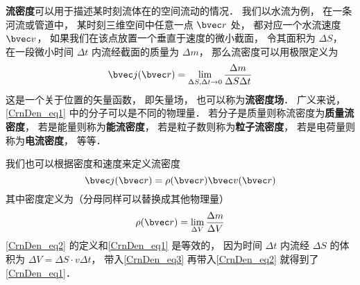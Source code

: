 

\textbf{流密度}可以用于描述某时刻流体在的空间流动的情况． 我们以水流为例， 在一条河流或管道中， 某时刻三维空间中任意一点 $\bvec r$ 处， 都对应一个水流速度 $\bvec v$， 如果我们在该点放置一个垂直于速度的微小截面， 令其面积为 $\Delta S$， 在一段微小时间 $\Delta t$ 内流经截面的质量为 $\Delta m$， 那么流密度可以用极限定义为
\begin{equation}\label{CrnDen_eq1}
\bvec j(\bvec r) = \lim_{\Delta S, \Delta t \to 0} \frac{\Delta m}{\Delta S \Delta t}
\end{equation}
这是一个关于位置的矢量函数， 即矢量场， 也可以称为\textbf{流密度场}． 广义来说， \autoref{CrnDen_eq1} 中的分子可以是不同的物理量． 若分子是质量则称流密度为\textbf{质量流密度}， 若是能量则称为\textbf{能流密度}， 若是粒子数则称为\textbf{粒子流密度}， 若是电荷量则称为\textbf{电流密度}， 等等． 

我们也可以根据密度和速度来定义流密度
\begin{equation}\label{CrnDen_eq2}
\bvec j(\bvec r) = \rho(\bvec r) \bvec v(\bvec r)
\end{equation}
其中密度定义为（分母同样可以替换成其他物理量）
\begin{equation}\label{CrnDen_eq3}
\rho(\bvec r) = \lim_{\Delta V} \frac{\Delta m}{\Delta V}
\end{equation}
\autoref{CrnDen_eq2} 的定义和\autoref{CrnDen_eq1} 是等效的， 因为时间 $\Delta t$ 内流经 $\Delta S$ 的体积为 $\Delta V = \Delta S \cdot v  \Delta t$， 带入\autoref{CrnDen_eq3} 再带入\autoref{CrnDen_eq2} 就得到了\autoref{CrnDen_eq1}．
